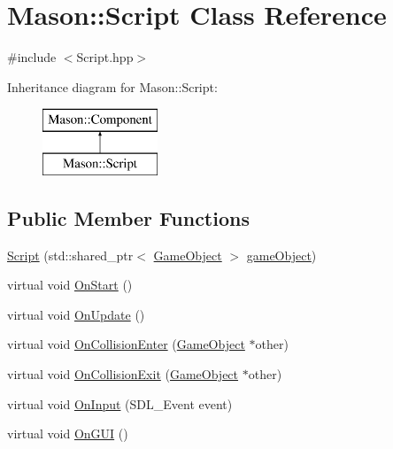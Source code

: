 \hypertarget{class_mason_1_1_script}{}\section{Mason\+:\+:Script Class Reference}
\label{class_mason_1_1_script}


{\ttfamily \#include $<$Script.\+hpp$>$}

Inheritance diagram for Mason\+:\+:Script\+:\begin{figure}[H]
\begin{center}
\leavevmode
\includegraphics[height=2.000000cm]{class_mason_1_1_script}
\end{center}
\end{figure}
\subsection*{Public Member Functions}
\begin{DoxyCompactItemize}
\item 
\hyperlink{class_mason_1_1_script_a3d41c440d07b53c15437a13754eff7d0}{Script} (std\+::shared\+\_\+ptr$<$ \hyperlink{class_mason_1_1_game_object}{Game\+Object} $>$ \hyperlink{class_mason_1_1_component_abaa67b569d0a70e26a4606f4a099a925}{game\+Object})
\item 
virtual void \hyperlink{class_mason_1_1_script_aa42915c752bb7f4623ca679b222edf2f}{On\+Start} ()
\item 
virtual void \hyperlink{class_mason_1_1_script_acafa4283460fb677484bb43ebec37743}{On\+Update} ()
\item 
virtual void \hyperlink{class_mason_1_1_script_a1088013d6edc47d74643aa48a7cbbbdf}{On\+Collision\+Enter} (\hyperlink{class_mason_1_1_game_object}{Game\+Object} $\ast$other)
\item 
virtual void \hyperlink{class_mason_1_1_script_a04d09648b7dba1bcb0a0ad3c3570e2f3}{On\+Collision\+Exit} (\hyperlink{class_mason_1_1_game_object}{Game\+Object} $\ast$other)
\item 
virtual void \hyperlink{class_mason_1_1_script_a84fff8072c4e8b56fb242b29f3491224}{On\+Input} (S\+D\+L\+\_\+\+Event event)
\item 
virtual void \hyperlink{class_mason_1_1_script_aa993a4ef5572ba31f5fa0ce2fa4a733e}{On\+G\+UI} ()
\end{DoxyCompactItemize}
